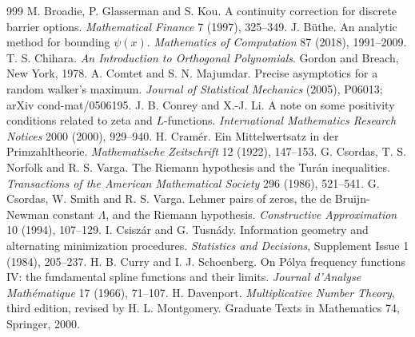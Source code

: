 \begin{thebibliography}{999}
 M. Broadie, P. Glasserman and S. Kou. A continuity correction for discrete barrier options. \emph{Mathematical Finance} 7 (1997), 325--349.
 J. B\"uthe. An analytic method for bounding $\psi(x)$. \emph{Mathematics of Computation} 87 (2018), 1991--2009.
 T. S. Chihara. \emph{An Introduction to Orthogonal Polynomials}. Gordon and Breach, New York, 1978.
 A. Comtet and S. N. Majumdar. Precise asymptotics for a random walker's maximum. \emph{Journal of Statistical Mechanics} (2005), P06013; arXiv cond-mat/0506195.
 J. B. Conrey and X.-J. Li. A note on some positivity conditions related to zeta and $L$-functions. \emph{International Mathematics Research Notices} 2000 (2000), 929--940.
 H. Cram\'er. Ein Mittelwertsatz in der Primzahltheorie. \emph{Mathematische Zeitschrift} 12 (1922), 147--153.
 G. Csordas, T. S. Norfolk and R. S. Varga. The Riemann hypothesis and the Tur\'an inequalities. \emph{Transactions of the American Mathematical Society} 296 (1986), 521--541.
 G. Csordas, W. Smith and R. S. Varga. Lehmer pairs of zeros, the de Bruijn-Newman constant $\Lambda$, and the Riemann hypothesis. \emph{Constructive Approximation} 10 (1994), 107--129.
 I. Csisz\'ar and G. Tusn\'ady. Information geometry and alternating minimization procedures. \emph{Statistics and Decisions}, Supplement Issue 1 (1984), 205--237.
 H. B. Curry and I. J. Schoenberg. On P\'olya frequency functions IV: the fundamental spline functions and their limits. \emph{Journal d'Analyse Math\'ematique} 17 (1966), 71--107.
 H. Davenport. \emph{Multiplicative Number Theory}, third edition, revised by H. L. Montgomery. Graduate Texts in Mathematics 74, Springer, 2000.

\end{thebibliography}
